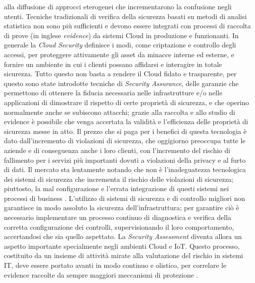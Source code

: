 alla diffusione di approcci eterogenei che incrementarono la confusione negli utenti. 
Tecniche tradizionali di verifica della sicurezza basati su metodi di analisi statistica non sono più sufficienti e devono essere integrati 
con processi di raccolta di prove (in inglese \textit{evidence}) da sistemi Cloud in produzione e funzionanti. 
In generale la \textit{Cloud Security} definisce i modi, come criptazione e controllo degli accessi, per proteggere attivamente gli asset 
da minacce interne ed esterne, e fornire un ambiente in cui i clienti possano affidarsi e interagire in totale sicurezza.\hfill\break
Tutto questo non basta a rendere il Cloud fidato e trasparente, per questo sono state introdotte tecniche di
\textit{Security Assurance}, delle garanzie che permettono di ottenere la fiducia necessaria nelle infrastrutture e/o nelle 
applicazioni di dimostrare il rispetto di certe proprietà di sicurezza, e che operino normalmente anche se subiscono attacchi; grazie 
alla raccolta e allo studio di evidence è possibile che venga accertata la validità e l'efficienza delle proprietà di sicurezza messe in 
atto. \hfill\break
Il prezzo che si paga per i benefici di questa tecnologia è dato dall'incremento di violazioni di sicurezza, che oggigiorno 
preoccupa tutte le aziende e di conseguenza anche i loro clienti, con l'incremento del rischio di fallimento per i servizi più importanti 
dovuti a violazioni della privacy e al furto di dati.
Il mercato sta lentamente notando che non è l'inadeguatezza tecnologica dei sistemi di sicurezza che incrementa il rischio delle 
violazioni di sicurezza; piuttosto, la mal configurazione e l'errata integrazione di questi sistemi nei processi di business 
\cite{cloud-Platform-for-ICT-Security-Governance}.\hfill\break
L'utilizzo di sistemi di sicurezza e di controllo migliori non garantisce in modo assoluto la sicurezza dell'infrastruttura; 
per garantire ciò è necessario implementare un processo continuo di diagnostica e verifica della corretta configurazione dei controlli, 
supervisionando il loro comportamento, accertandosi che sia quello aspettato. \vspace{0.5 cm}\hfill\break
La \textit{Security Assessment} diventa allora un aspetto importante specialmente negli ambienti Cloud e IoT. Questo processo, costituito
da un insieme di attività mirate alla valutazione del rischio in sistemi IT, deve essere portato avanti in modo continuo e olistico, per 
correlare le evidence raccolte da sempre maggiori meccanismi di protezione \cite{mooncloud-semi-automatic-and-trustworthy}.\hfill\break

